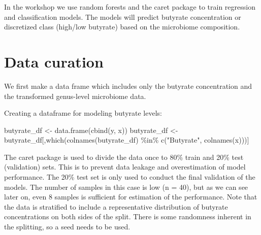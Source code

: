 \documentclass[
  oneside]{book}
\newenvironment{Shaded}{\begin{snugshade}}{\end{snugshade}}
\newcommand{\AttributeTok}[1]{\textcolor[rgb]{0.77,0.63,0.00}{#1}}
\newcommand{\ConstantTok}[1]{\textcolor[rgb]{0.00,0.00,0.00}{#1}}
\newcommand{\DecValTok}[1]{\textcolor[rgb]{0.00,0.00,0.81}{#1}}
\newcommand{\FunctionTok}[1]{\textcolor[rgb]{0.00,0.00,0.00}{#1}}
\newcommand{\NormalTok}[1]{#1}
\newcommand{\OtherTok}[1]{\textcolor[rgb]{0.56,0.35,0.01}{#1}}
\newcommand{\SpecialCharTok}[1]{\textcolor[rgb]{0.00,0.00,0.00}{#1}}
\newcommand{\StringTok}[1]{\textcolor[rgb]{0.31,0.60,0.02}{#1}}
\begin{document}
In the workshop we use random forests and the caret package to train regression and
classification models. The models will predict butyrate concentration or discretized
class (high/low butyrate) based on the microbiome composition.

\hypertarget{data-curation}{%
\section{Data curation}\label{data-curation}}

We first make a data frame which includes only the butyrate concentration and the
transformed genus-level microbiome data.

Creating a dataframe for modeling butyrate levels:

\begin{Shaded}
\begin{Highlighting}[]
\NormalTok{butyrate\_df }\OtherTok{\textless{}{-}} \FunctionTok{data.frame}\NormalTok{(}\FunctionTok{cbind}\NormalTok{(y, x))}
\NormalTok{butyrate\_df }\OtherTok{\textless{}{-}}\NormalTok{ butyrate\_df[,}\FunctionTok{which}\NormalTok{(}\FunctionTok{colnames}\NormalTok{(butyrate\_df) }\SpecialCharTok{\%in\%} \FunctionTok{c}\NormalTok{(}\StringTok{"Butyrate"}\NormalTok{, }\FunctionTok{colnames}\NormalTok{(x)))]}
\end{Highlighting}
\end{Shaded}

The caret package is used to divide the data once to 80\% train and 20\% test (validation)
sets. This is to prevent data leakage and overestimation of model performance. The
20\% test set is only used to conduct the final validation of the models. The number of
samples in this case is low (n = 40), but as we can see later on, even 8 samples is
sufficient for estimation of the performance. Note that the data is stratified to include
a representative distribution of butyrate concentrations on both sides of the split.
There is some randomness inherent in the splitting, so a seed needs to be used.

\begin{Shaded}
\end{Shaded}
\end{document}
